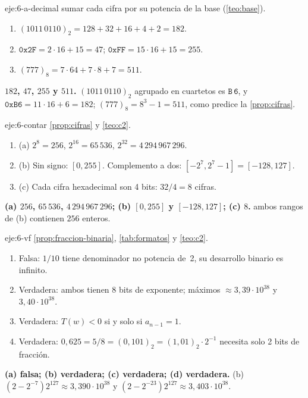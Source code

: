 \begin{solucion}{eje:6-a-decimal}
\planteamiento sumar cada cifra por su potencia de la base (\cref{teo:base}).
\pasos
\begin{enumerate}[label=\arabic*.]
  \item $(1011\,0110)_2=128+32+16+4+2=182$.
  \item $\texttt{0x2F}=2\cdot16+15=47$; $\texttt{0xFF}=15\cdot16+15=255$.
  \item $(777)_8=7\cdot64+7\cdot8+7=511$.
\end{enumerate}
\resultado \textbf{$182$, $47$, $255$ y $511$.}
\comprobacion $(1011\,0110)_2$ agrupado en cuartetos es $\texttt{B}\,\texttt{6}$, y $\texttt{0xB6}=11\cdot16+6=182$; $(777)_8=8^3-1=511$, como predice la \cref{prop:cifras}.
\end{solucion}

\begin{solucion}{eje:6-contar}
\planteamiento \cref{prop:cifras} y \cref{teo:c2}.
\pasos
\begin{enumerate}[label=\arabic*.]
  \item (a) $2^8=256$, $2^{16}=65\,536$, $2^{32}=4\,294\,967\,296$.
  \item (b) Sin signo: $[0,255]$. Complemento a dos: $[-2^7,2^7-1]=[-128,127]$.
  \item (c) Cada cifra hexadecimal son 4 bits: $32/4=8$ cifras.
\end{enumerate}
\resultado \textbf{(a) $256$, $65\,536$, $4\,294\,967\,296$; (b) $[0,255]$ y $[-128,127]$; (c) $8$.}
\comprobacion ambos rangos de (b) contienen $256$ enteros.
\end{solucion}

\begin{solucion}{eje:6-vf}
\planteamiento \cref{prop:fraccion-binaria}, \cref{tab:formatos} y \cref{teo:c2}.
\pasos
\begin{enumerate}[label=(\alph*)]
  \item Falsa: $1/10$ tiene denominador no potencia de~2, su desarrollo binario es infinito.
  \item Verdadera: ambos tienen 8 bits de exponente; máximos $\approx3{,}39\cdot10^{38}$ y $3{,}40\cdot10^{38}$.
  \item Verdadera: $T(w)<0$ si y solo si $a_{n-1}=1$.
  \item Verdadera: $0{,}625=5/8=(0{,}101)_2=(1{,}01)_2\cdot2^{-1}$ necesita solo 2 bits de fracción.
\end{enumerate}
\resultado \textbf{(a) falsa; (b) verdadera; (c) verdadera; (d) verdadera.}
\comprobacion (b) $(2-2^{-7})2^{127}\approx3{,}390\cdot10^{38}$ y $(2-2^{-23})2^{127}\approx3{,}403\cdot10^{38}$.
\end{solucion}

